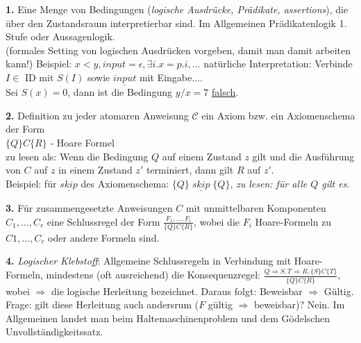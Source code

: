 \begin{compactitem}
	\item[\textbf{1.}] Eine Menge von Bedingungen (\emph{logische Ausdrücke, Prädikate, assertions}), die über den Zustandsraum interpretierbar sind. Im Allgemeinen Prädikatenlogik 1. Stufe oder Aussagenlogik.\\
	(formales Setting von logischen Ausdrücken vorgeben, damit man damit arbeiten kann!)
	Beispiel: $x < y, input = \epsilon, \exists i.x=p.i, ...$ 
	natürliche Interpretation: Verbinde $I \in$ ID mit $S(I)$ sowie $\underline{input}$ mit Eingabe....\\
	Sei $S(x)=0$, dann ist die Bedingung $y/x=7$ \underline{falsch}.\\
	\item[\textbf{2.}] Definition zu jeder atomaren Anweisung $\mathcal{C}$ ein Axiom bzw. ein Axiomenschema der Form\\
	$\{Q\}C\{R\}$ - Hoare Formel\\
	zu lesen als: Wenn die Bedingung $Q$ auf einem Zustand $z$ gilt und die Ausführung von $C$ auf $z$ in einem Zustand $z'$ terminiert, dann gilt $R$ auf $z'$.\\
	Beispiel: für $\underline{skip}$ des Axiomenschema: $\{Q\}\;\underline{skip}\;\{Q\}$, \emph{zu lesen: für alle $Q$ gilt es}.\\
	\item[\textbf{3.}] Für zusammengesetzte Anweisungen $C$ mit unmittelbaren Komponenten $C_1,\dots,C_r$ eine Schlussregel der Form $\frac{F_1,\dots,F_i}{\{Q\}C\{R\}}$, wobei die $F_i$ Hoare-Formeln zu $C1, \dots, C_r$ oder andere Formeln sind.\\
	\item[\textbf{4.}] \emph{Logischer Klebstoff}: Allgemeine Schlussregeln in Verbindung mit Hoare-Formeln, mindestens (oft ausreichend) die Konsequenzregel: $\frac{Q\Rightarrow S, T \Rightarrow R, \{S\}C\{T\}}{\{Q\}C\{R\}}$, wobei $\Rightarrow$ die logische Herleitung bezeichnet. Daraus folgt: Beweisbar $\Rightarrow$ Gültig. Frage: gilt diese Herleitung auch andersrum ($F$ gültig $\Rightarrow$ beweisbar)? Nein. Im Allgemeinen landet man beim Haltemaschinenproblem und dem Gödelschen Unvollständigkeitssatz.\\
\end{compactitem}

